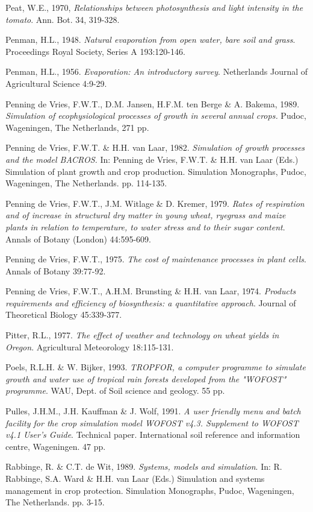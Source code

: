 Peat, W.E., 1970, {\it Relationships between photosynthesis and light intensity in the tomato\/}. Ann. Bot.
34, 319-328.

Penman, H.L., 1948. {\it Natural evaporation from open water, bare soil and grass\/}. Proceedings Royal
Society, Series A 193:120-146.

Penman, H.L., 1956. {\it Evaporation: An introductory survey\/}. Netherlands Journal of Agricultural
Science 4:9-29.

Penning de Vries, F.W.T., D.M. Jansen, H.F.M. ten Berge \& A. Bakema, 1989. {\it Simulation of
ecophysiological processes of growth in several annual crops.\/} Pudoc, Wageningen, The Netherlands,
271 pp.

Penning de Vries, F.W.T. \& H.H. van Laar, 1982. {\it Simulation of growth processes and the model
BACROS. \/}In: Penning de Vries, F.W.T. \& H.H. van Laar (Eds.) Simulation of plant growth and
crop production. Simulation Monographs, Pudoc, Wageningen, The Netherlands. pp. 114-135.

Penning de Vries, F.W.T., J.M. Witlage \& D. Kremer, 1979. {\it Rates of respiration and of increase
in structural dry matter in young wheat, ryegrass and maize plants in relation to temperature, to
water stress and to their sugar content\/}. Annals of Botany (London) 44:595-609.

Penning de Vries, F.W.T., 1975. {\it The cost of maintenance processes in plant cells\/}. Annals of Botany
39:77-92.

Penning de Vries, F.W.T., A.H.M. Brunsting \& H.H. van Laar, 1974. {\it Products requirements and
efficiency of biosynthesis: a quantitative approach\/}. Journal of Theoretical Biology 45:339-377.

Pitter, R.L., 1977. {\it The effect of weather and technology on wheat yields in Oregon\/}. Agricultural
Meteorology 18:115-131.

Poels, R.L.H. \& W. Bijker, 1993. {\it TROPFOR, a computer pro\-gramme to simulate growth and water
use of tropical rain forests developed from the "WOFOST" programme\/}. WAU, Dept. of Soil science
and geology. 55 pp.

Pulles, J.H.M., J.H. Kauffman \& J. Wolf, 1991. {\it A user {\nobreak}friendly menu and batch facility for the crop
simulation model WOFOST v4.3. Supplement to WOFOST v4.1 User's Guide\/}. Technical paper.
International soil reference and information centre, Wageningen. 47 pp.

Rabbinge, R. \& C.T. de Wit, 1989. {\it Systems, models and simulation\/}. In: R. Rabbinge, S.A. Ward
\& H.H. van Laar (Eds.) Simulation and systems management in crop protection. Simulation
Monographs, Pudoc, Wageningen, The Netherlands. pp. 3-15.

